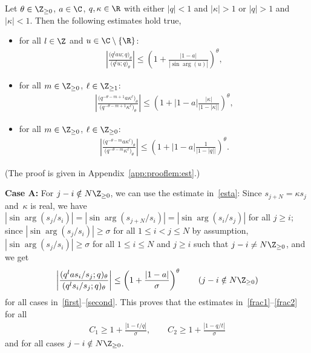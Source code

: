 \begin{Lemma}\label{lem:est}
Let $\theta\in\Z_{\geq 0}$, $a\in\C$, $q, \kappa\in\R$ with either $|q|<1$ and $|\kappa|>1$ or $|q|>1$ and $|\kappa|<1$. Then the following estimates hold true,
\begin{itemize}\itemsep=0pt
\item[$(a)$] for all $l\in\Z$ and $u\in\C\setminus\{\R\}$:
\begin{gather}\label{esta}
\left| \frac{\big(q^{l}au;q\big)_\theta}{\big(q^l u;q\big)_\theta}\right|\leq \left( 1 + \frac{|1-a|}{|\sin\arg(u)|}\right)^\theta\!,
\end{gather}
\item[$(b)$] for all $m\in\Z_{\geq 0}$, $\ell\in\Z_{\geq 1}$:
\begin{gather}\label{estb}
\left|\frac{\big( q^{-\theta-m+1} a \kappa^\ell \big)_\theta}{\big(q^{-\theta-m+1} \kappa^\ell \big)_\theta} \right| \leq \left(1+|1-a|\frac{|\kappa|}{|1-|\kappa||} \right)^\theta\!,
\end{gather}
\item[$(c)$] for all $m\in\Z_{\geq 0}$, $\ell\in\Z_{\geq 0}$:
\begin{gather}\label{estc}
\left|\frac{\big( q^{-\theta-m} a \kappa^\ell \big)_\theta}{\big(q^{-\theta-m} \kappa^\ell \big)_\theta} \right| \leq \left(1+|1-a|\frac{1}{|1-|q||} \right)^\theta\!.
\end{gather}
\end{itemize}
\end{Lemma}
(The proof is given in Appendix~\ref{app:prooflem:est}.)

{\bf Case A:} For $j-i\notin N\Z_{\geq 0}$, we can use the estimate in~\eqref{esta}:
Since $s_{j+N}=\kappa s_j$ and~$\kappa$ is real, we have $|\sin\arg(s_j/s_i)|=|\sin\arg(s_{j+N}/s_i)|=|\sin\arg(s_i/s_j)|$ for all $j\geq i$;
since $|\sin\arg(s_j/s_i)|\geq \sigma$ for all $1\leq i<j\leq N$ by assumption, $|\sin\arg(s_j/s_i)|\geq \sigma$ for all $1\leq i\leq N$ and $j\geq i$ such that $j-i\neq N\Z_{\geq 0}$, and we get
\begin{gather*}
\left|\frac{(q^{l}as_i/s_j;q)_\theta}{(q^l s_i/s_j;q)_\theta}\right| \leq \left(1+\frac{|1-a|}{\sigma} \right)^\theta\qquad
(j-i\notin N\Z_{\geq 0})
\end{gather*}
for all cases in~\eqref{first}--\eqref{second}. This proves that the estimates in~\eqref{frac1}--\eqref{frac2} for all
\begin{gather}
\label{C1C2A}
C_1\geq 1+\frac{|1-t/q|}{\sigma},\qquad
C_2\geq 1+\frac{|1-q/t|}{\sigma}
\end{gather}
and for all cases $j-i\notin N\Z_{\geq 0}$.

